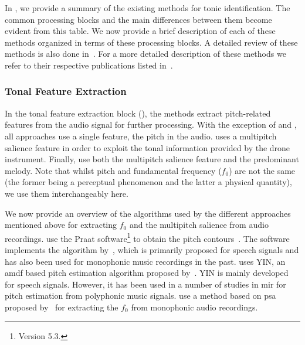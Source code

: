 In , we provide a summary of the existing methods for tonic identification. The common processing blocks and the main differences between them become evident from this table. We now provide a brief description of each of these methods organized in terms of these processing blocks. A detailed review of these methods is also done in~\cite{Gulati2014Tonic}. For a more detailed description of these methods we refer to their respective publications listed in~.


\subsubsection{Tonal Feature Extraction}
\label{Feature Extraction}

In the tonal feature extraction block (), the methods extract pitch-related
features from the audio signal for further processing. With the exception of \cite{salamon2012multipitch} and \cite{gulati2012two}, all approaches use a single feature, the pitch in the audio. \cite{salamon2012multipitch} uses a multipitch salience feature in order to exploit the tonal information provided by the drone instrument. Finally, \cite{gulati2012two} use both the multipitch salience feature and the predominant melody. Note that whilst pitch and fundamental frequency ($f_0$) are not the same (the former being a perceptual phenomenon and the latter a physical quantity), we use them interchangeably here.

We now provide an overview of the algorithms used by the different approaches mentioned above for extracting $f_0$ and the multipitch salience from audio recordings. \cite{ranjani2011carnatic} use the Praat software\footnote{Version 5.3.} to obtain the pitch contours~\citep{BoersmaPaul2001}. The software implements the algorithm by~\cite{boersma1993accurate}, which is primarily proposed for speech signals and has also been used for monophonic music recordings in the past. \cite{bellur2012knowledge} uses YIN, an \gls{amdf} based pitch estimation algorithm proposed by~\cite{DeCheveigne2002}. YIN is mainly developed for speech signals. However, it has been used in a number of studies in \gls{mir} for pitch estimation from polyphonic music signals. \cite{Sengupta2005b} use a method based on \gls{psa} proposed by~\cite{AKDatta_1996} for extracting the $f_0$ from monophonic audio recordings. %


